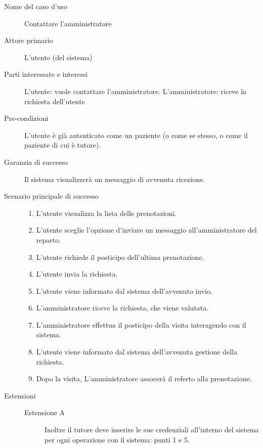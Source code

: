 \begin{description}
\item[Nome del caso d'uso]
        Contattare l'amministratore

\item[Attore primario]
        L'utente (del sistema)

\item[Parti interessate e interessi]
\begin{itemize}
\diam L'utente: vuole contattare l'amministratore.
\diam L'amministratore: riceve la richiesta dell'utente
\end{itemize}

\item[Pre-condizioni]
        L'utente è già autenticato come un paziente (o come se stesso, o come il 
        paziente di cui è tutore).

\item[Garanzia di successo]
        Il sistema visualizzerà un messaggio di avvenuta ricezione.

\item[Scenario principale di successo]
\begin{enumerate}
\item L'utente visualizza la lista delle prenotazioni.
\item L'utente sceglie l'opzione d'inviare un messaggio all'amministratore del reparto.
\item L'utente richiede il posticipo dell'ultima prenotazione. 
\item L'utente invia la richiesta.
\item L'utente viene informato dal sistema dell'avvenuto invio.
\item L'amministratore riceve la richiesta, che viene valutata.
\item L'amministratore effettua il posticipo della visita interagendo con il sistema.
\item L'utente viene informato dal sistema dell'avvenuta gestione della richiesta.
\item Dopo la visita, L'amministratore assocerà il referto alla prenotazione.
\end{enumerate}

\item[Estensioni]
\begin{description}
	\item[Estensione A]
	\medskip
	
	Inoltre il tutore deve inserire le sue credenziali 
	all'interno del sistema per ogni operazione con il sistema: punti 1 e 5.
	

\end{description}
\end{description}
